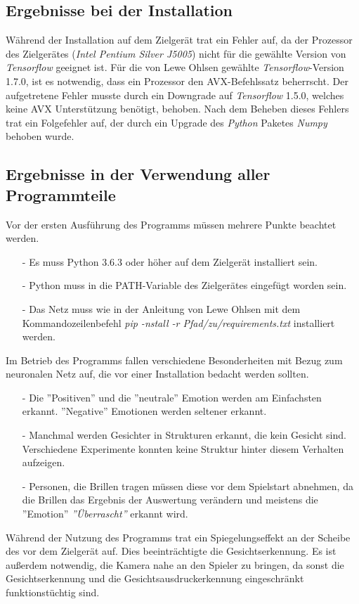 \documentclass[12pt,a4paper,headinclude,twoside, plainheadsepline, open=right,numbers=noenddot]{scrreprt}
\begin{document}
\subsection{Ergebnisse bei der Installation}
W\"{a}hrend der Installation auf dem Zielger\"{a}t trat ein Fehler auf, da der Prozessor des Zielger\"{a}tes (\textit{Intel Pentium Silver J5005})  nicht f\"{u}r die gew\"{a}hlte Version von \textit{Tensorflow} geeignet ist. F\"{u}r die von Lewe Ohlsen \citep{LeweOhlsenGit} gew\"{a}hlte \textit{Tensorflow}-Version 1.7.0, ist es notwendig, dass ein Prozessor den AVX-Befehlssatz beherrscht. Der aufgetretene Fehler musste durch ein Downgrade auf \textit{Tensorflow} 1.5.0, welches keine AVX Unterst\"{u}tzung ben\"{o}tigt, behoben. Nach dem Beheben dieses Fehlers trat ein Folgefehler auf, der durch ein Upgrade des \textit{Python} Paketes \textit{Numpy} behoben wurde. 
\subsection{Ergebnisse in der Verwendung aller Programmteile}
Vor der ersten Ausf\"{u}hrung des Programms m\"{u}ssen mehrere Punkte beachtet werden.
\begin{itemize}
\item[-] Es muss Python 3.6.3 oder h\"{o}her auf dem Zielger\"{a}t installiert sein.
\item[-] Python muss in die PATH-Variable des Zielger\"{a}tes eingef\"{u}gt worden sein.
\item[-] Das Netz muss wie in der Anleitung\cite{LeweOhlsenGit} von Lewe Ohlsen mit dem Kommandozeilenbefehl \textit{pip -nstall -r Pfad/zu/requirements.txt} installiert werden.
\end{itemize} 
Im Betrieb des Programms fallen verschiedene Besonderheiten mit Bezug zum neuronalen Netz auf, die vor einer Installation bedacht werden sollten.
\begin{itemize}
\item[-] Die ''Positiven'' und die ''neutrale'' Emotion werden am Einfachsten erkannt. ''Negative'' Emotionen werden seltener erkannt.
\item[-] Manchmal werden Gesichter in Strukturen erkannt, die kein Gesicht sind. Verschiedene Experimente konnten keine Struktur hinter diesem Verhalten aufzeigen.
\item[-] Personen, die Brillen tragen m\"{u}ssen diese vor dem Spielstart abnehmen, da die Brillen das Ergebnis der Auswertung ver\"{a}ndern und meistens die ''Emotion'' \textit{''\"{U}berrascht''} erkannt wird. 
\end{itemize}
W\"{a}hrend der Nutzung des Programms trat ein Spiegelungseffekt an der Scheibe des vor dem Zielger\"{a}t auf. Dies beeinträchtigte die Gesichtserkennung. Es ist au{\ss}erdem notwendig, die Kamera nahe an den Spieler zu bringen, da sonst die Gesichtserkennung und die Gesichtsausdruckerkennung eingeschr\"{a}nkt funktionst\"{u}chtig sind. 
\end{document}
